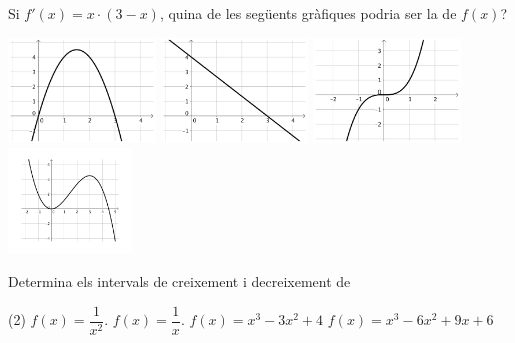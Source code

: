 		
		\begin{mylist}
			
			
			\exer Si $f'(x) = x\cdot (3 - x)$, quina de les següents gràfiques podria ser la de $f (x)$? 
			
			\begin{center}
				\includegraphics*[height=1.1in, keepaspectratio=true]{img-07/chap-deriv-opt-a.pdf} \hspace{0.24cm}
				\includegraphics*[height=1.1in, keepaspectratio=true]{img-07/chap-deriv-opt-b.pdf}  \hspace{0.24cm}
				\includegraphics*[height=1.1in, keepaspectratio=true]{img-07/chap-deriv-opt-c.pdf}  \hspace{0.24cm}
				\includegraphics*[height=1.1in, keepaspectratio=true]{img-07/chap-deriv-opt-d.pdf}   
			\end{center}
		
		
			\exer Determina els intervals de creixement i decreixement de
		\begin{tasks}(2)
			\task $f (x) = \dfrac{1}{ x^{2}}$.
			\task $f (x) = \dfrac{1}{ x}$.
			\task $f (x) = x^{3} - 3x^{2} + 4$
			\task $f (x) = x^{3} - 6x^{2} + 9x + 6$
		\end{tasks}
		
			
		\end{mylist}

